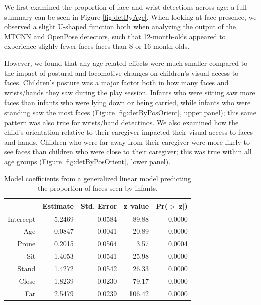 \documentclass[10pt, letterpaper]{article}
\begin{document}
We first examined the proportion of face and wrist detections across
age; a full summary can be seen in Figure \ref{fig:detByAge}. When
looking at face presence, we observed a slight U-shaped function both
when analyzing the output of the MTCNN and OpenPose detectors, such that
12-month-olds appeared to experience slighly fewer faces faces than 8 or
16-month-olds.

However, we found that any age related effects were much smaller
compared to the impact of postural and locomotive changes on children's
visual access to faces. Children's posture was a major factor both in
how many faces and wrists/hands they saw during the play session.
Infants who were sitting saw more faces than infants who were lying down
or being carried, while infants who were standing saw the most faces
(Figure \ref{fig:detByPosOrient}, upper panel); this same pattern was
also true for wrists/hand detectinos. We also examined how the child's
orientation relative to their caregiver impacted their visual access to
faces and hands. Children who were far away from their caregiver were
more likely to see faces than children who were close to their
caregiver; this was true within all age groups (Figure
\ref{fig:detByPosOrient}, lower panel).

\begin{table}[H]
\centering
\begin{tabular}{rrrrr}
  \hline
 & Estimate & Std. Error & z value & Pr($>$$|$z$|$) \\ 
  \hline
Intercept & -5.2469 & 0.0584 & -89.88 & 0.0000 \\ 
  Age & 0.0847 & 0.0041 & 20.89 & 0.0000 \\ 
  Prone & 0.2015 & 0.0564 & 3.57 & 0.0004 \\ 
  Sit & 1.4053 & 0.0541 & 25.98 & 0.0000 \\ 
  Stand & 1.4272 & 0.0542 & 26.33 & 0.0000 \\ 
  Close & 1.8239 & 0.0230 & 79.17 & 0.0000 \\ 
  Far & 2.5479 & 0.0239 & 106.42 & 0.0000 \\ 
   \hline
\end{tabular}
\caption{Model coefficients from a generalized linear model predicting the proportion of faces seen by infants.} 
\end{table}
\end{document}
